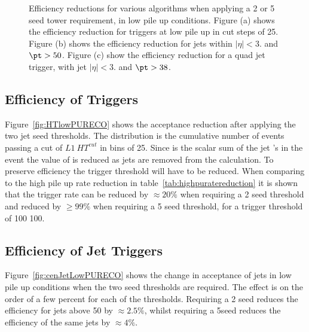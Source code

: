\begin{figure}[h!]
    \centering
     \newline
    \caption{Efficiency reductions for various \Lone algorithms when applying a 
    2 or \unit{5}{\GeV} seed tower requirement, in low pile up 
    conditions. Figure (a) shows the efficiency reduction for \HT triggers at 
    low pile up in cut steps of \unit{25}{\GeV}. Figure (b) 
    shows the efficiency reduction for jets within $|\eta| <3.$ and $\pt > 
    50$\GeV. Figure (c) show the efficiency reduction for a quad jet trigger, 
    with jet $|\eta| <3.$ and $\pt > 38$\GeV.}
    \label{fig:lowpuratereductionRECO}
\end{figure}



\subsection{Efficiency of \HT Triggers} %
\label{par:Efficneicy of HT triggers}
Figure~\ref{fig:HTlowPURECO} shows the acceptance reduction after applying the 
two jet seed thresholds. The distribution is the cumulative number of events 
passing a cut of $L1~HT^{cut}$ in bins of \unit{25}{\GeV}. Since \HT is the 
scalar sum of the jet \PT's in the event the value of \Lone \HT is reduced as 
jets are removed from the calculation. To preserve efficiency the \Lone trigger 
threshold will have to be reduced. When comparing to the high pile up rate 
reduction in table~\ref{tab:highpuratereduction} it is shown that the trigger 
rate can be reduced by $\approx 20\%$ when requiring a \unit{2}{\GeV} seed 
threshold and reduced by $\geq 99\%$ when requiring a \unit{5}{\GeV} seed 
threshold, for a trigger threshold of 100 \unit{100}{\GeV}.


\subsection{Efficiency of Jet Triggers} %
\label{par:Efficiency of Jet Triggers}
Figure~\ref{fig:cenJetLowPURECO} shows the change in acceptance of jets in low 
pile up conditions when the two seed thresholds are required. The effect is on 
the order of a few percent for each of the thresholds. Requiring a 
\unit{2}{\GeV} seed reduces the efficiency for jets above \unit{50}{\GeV} by 
$\approx 2.5\%$, whilst requiring a 5\GeV seed reduces the efficiency of the 
same jets by $\approx 4\%$.

